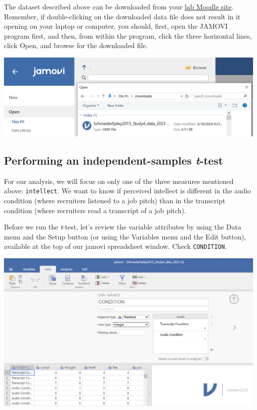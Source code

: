\documentclass[
]{book}
\begin{document}
The dataset described above can be downloaded from your \href{https://moodle.stfx.ca}{lab Moodle site}. Remember, if double-clicking on the downloaded data file does not result in it opening on your laptop or computer, you should, first, open the JAMOVI program first, and then, from within the program, click the three horizontal lines, click {Open}, and browse for the downloaded file.

\includegraphics{img/OpenFileFromWithinJAMOVI.png}

\hypertarget{performing-an-independent-samples-t-test-1}{%
\subsection{\texorpdfstring{Performing an independent-samples \emph{t}-test}{Performing an independent-samples t-test}}\label{performing-an-independent-samples-t-test-1}}

For our analysis, we will focus on only one of the three measures mentioned above: \texttt{intellect}. We want to know if perceived intellect is different in the audio condition (where recruiters listened to a job pitch) than in the transcript condition (where recruiters read a transcript of a job pitch).

Before we run the \emph{t}-test, let's review the variable attributes by using the {Data} menu and the {Setup} button (or using the {Variables} menu and the {Edit} button), available at the top of our jamovi spreadsheet window. Check \texttt{CONDITION}.

\includegraphics{img/VariableAttributesForConditionVariable.png}
\end{document}
